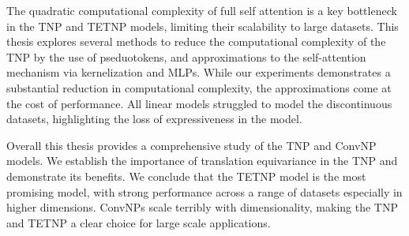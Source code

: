 \documentclass[../../main.tex]{subfiles}
\begin{document}
The quadratic computational complexity of full self attention is a key bottleneck in the TNP and TETNP models, limiting their scalability to large datasets. This thesis explores several methods to reduce the computational complexity of the TNP by the use of pseduotokens, and approximations to the self-attention mechanism via kernelization and MLPs. While our experiments demonstrates a substantial reduction in computational complexity, the approximations come at the cost of performance. All linear models struggled to model the discontinuous datasets, highlighting the loss of expressiveness in the model. 

Overall this thesis provides a comprehensive study of the TNP and ConvNP models. We establish the importance of translation equivariance in the TNP and demonstrate its benefits. We conclude that the TETNP model is the most promising model, with strong performance across a range of datasets especially in higher dimensions. ConvNPs scale terribly with dimensionality, making the TNP and TETNP a clear choice for large scale applications. 
\end{document}
